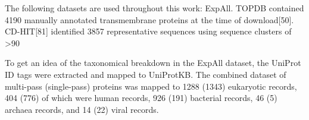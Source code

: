 The following datasets are used throughout this work:
ExpAll. TOPDB contained 4190 manually annotated transmembrane proteins at the time of download[50]. CD-HIT[81] identified 3857 representative sequences using sequence clusters of >90%

To get an idea of the taxonomical breakdown in the ExpAll dataset, the UniProt ID tags were extracted and mapped to UniProtKB. The combined dataset of multi-pass (single-pass) proteins was mapped to 1288 (1343) eukaryotic records, 404 (776) of which were human records, 926 (191) bacterial records, 46 (5) archaea records, and 14 (22) viral records.

